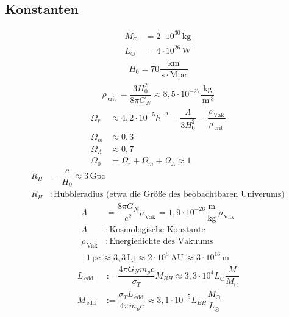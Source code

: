 \documentclass[a4paper,12pt]{article}
\numberwithin{equation}{section}
\begin{document}
\subsection{Konstanten}
\begin{align} 
        M_\odot&=2\cdot 10^{30}\,\text{kg}\,\\
        L_\odot&=4\cdot 10^{26}\,\text{W}\,
\end{align} 
\begin{align} 
        H_0=70\dfrac{\,\text{km}\,}{\,\text{s}\,\cdot \,\text{Mpc}\,}
\end{align} 
\begin{align} 
        \rho _{\,\text{crit}\,}=\dfrac{3H_0^2}{8\pi G_N}\approx 8,5\cdot 10^{-27}\dfrac{\,\text{kg}\,}{\,\text{m}\,^3}
\end{align} 
\begin{align} 
        \Omega _r&\approx 4,2\cdot 10^{-5}h^{-2}=\dfrac{\Lambda }{3H_0^2}=\dfrac{\rho _{\,\text{Vak}\,}}{\rho _{\,\text{crit}\,}}\\
        \Omega _m&\approx 0,3\\
        \Omega _\Lambda &\approx 0,7\\
        \Omega _0&=\Omega _r+\Omega _m+\Omega _\Lambda \approx 1
\end{align} 
\begin{align} 
        R_H&=\dfrac{c}{H_0}\approx 3\,\text{Gpc}\,\\
        R_H&:\,\text{Hubbleradius (etwa die Größe des beobachtbaren Univerums)}\,\nonumber 
\end{align} 
\begin{align} 
        \Lambda &=\dfrac{8\pi G_N}{c^2}\rho _{\,\text{Vak}\,}=1,9\cdot 10^{-26}\dfrac{\,\text{m}\,}{\,\text{kg}\,}\rho _{\,\text{Vak}\,}\\
        \Lambda &:\,\text{Kosmologische Konstante}\,\nonumber \\
        \rho _{\,\text{Vak}\,}&:\,\text{Energiedichte des Vakuums}\,\nonumber 
\end{align} 
\begin{align} 
        1\,\text{pc}\,\approx 3,3\,\text{Lj}\,\approx 2\cdot 10^5\,\text{AU}\,\approx 3\cdot 10^{16}\,\text{m}\,
\end{align} 
\begin{align} 
        L_{\,\text{edd}\,}&:=\dfrac{4\pi G_Nm_pc}{\sigma _T}M_{BH}\approx 3,3\cdot 10^4L_\odot\dfrac{M}{M_\odot}\\
        M_{\,\text{edd}\,}&:=\dfrac{\sigma _TL_{\,\text{edd}\,}}{4\pi m_pc}\approx 3,1\cdot 10^{-5}L_{BH}\dfrac{M_\odot}{L_\odot}
\end{align} 
\end{document}
